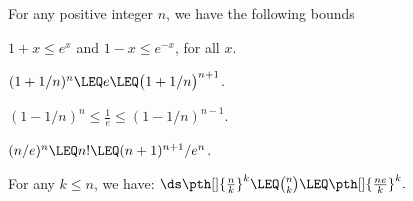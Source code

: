 \begin{lemma}
    For any positive integer $n$, we have the following bounds
    \begin{compactenumi}
        \medskip%
        \item $1+x \leq e^x$ \;\;and\;\; $1-x \leq e^{-x}$, for all $x$.

        \medskip
        \item $(1+1/n)^n \LEQ e \LEQ \bigl(1+1/n\bigr)^{n+1}$.

        \medskip
        \item $(1-1/n)^n \leq \frac{1}{e} \leq (1-1/n)^{n-1} $.

        \medskip
        \item {}
        $(n/e)^n \LEQ n! \LEQ (n+1)^{n+1} / e^n$.

        \item {} For any $k \leq n$, we have:
        \begin{math}
            \ds%
            \pth[]{\frac{n}{k}}^k
            \LEQ%
            \binom{n}{k}%
            \LEQ%
            \pth[]{\frac{n e}{k}}^k.
        \end{math}
    \end{compactenumi}
\end{lemma}
